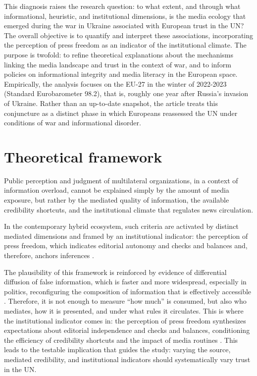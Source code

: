 \documentclass[english]{textolivre}
\begin{document}
This diagnosis raises the research question: to what extent, and through what informational, heuristic, and institutional dimensions, is the media ecology that emerged during the war in Ukraine associated with European trust in the UN? The overall objective is to quantify and interpret these associations, incorporating the perception of press freedom as an indicator of the institutional climate. The purpose is twofold: to refine theoretical explanations about the mechanisms linking the media landscape and trust in the context of war, and to inform policies on informational integrity and media literacy in the European space. Empirically, the analysis focuses on the EU-27 in the winter of 2022-2023 (Standard Eurobarometer 98.2), that is, roughly one year after Russia’s invasion of Ukraine. Rather than an up-to-date snapshot, the article treats this conjuncture as a distinct phase in which Europeans reassessed the UN under conditions of war and informational disorder.

\section{Theoretical framework}
Public perception and judgment of multilateral organizations, in a context of information overload, cannot be explained simply by the amount of media exposure, but rather by the mediated quality of information, the available credibility shortcuts, and the institutional climate that regulates news circulation.

In the contemporary hybrid ecosystem, such criteria are activated by distinct mediated dimensions and framed by an institutional indicator: the perception of press freedom, which indicates editorial autonomy and checks and balances and, therefore, anchors inferences \cite{norris2011}.

The plausibility of this framework is reinforced by evidence of differential diffusion of false information, which is faster and more widespread, especially in politics, reconfiguring the composition of information that is effectively accessible \cite{giusti2021, barnard2024}. Therefore, it is not enough to measure ``how much'' is consumed, but also who mediates, how it is presented, and under what rules it circulates. This is where the institutional indicator comes in: the perception of press freedom synthesizes expectations about editorial independence and checks and balances, conditioning the efficiency of credibility shortcuts and the impact of media routines \cite{tallberg2019}. This leads to the testable implication that guides the study: varying the source, mediated credibility, and institutional indicators should systematically vary trust in the UN.
\end{document}
